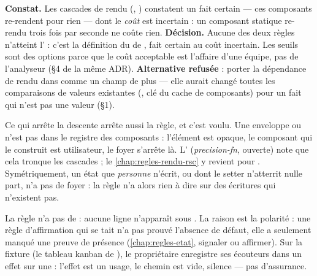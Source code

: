 \begin{decision}
\textbf{Constat.} Les cascades de rendu (, ) constatent un fait certain --- ces composants re-rendent pour rien --- dont le \emph{coût} est incertain : un composant statique re-rendu trois fois par seconde ne coûte rien.
\textbf{Décision.} Aucune des deux règles n'atteint l'\Error{} : c'est la définition du \Warning{} de , \og fait certain au coût incertain\fg. Les seuils sont des options parce que le coût acceptable est l'affaire d'une équipe, pas de l'analyseur (§4 de la même ADR). \textbf{Alternative refusée} : porter la dépendance de rendu dans  comme un champ de plus --- elle aurait changé toutes les comparaisons de valeurs existantes (, clé du cache de composants) pour un fait qui n'est pas une valeur (§1).
\end{decision}

Ce qui arrête la descente arrête aussi la règle, et c'est voulu. Une enveloppe  ou  n'est pas dans le registre des composants : l'élément est opaque, le composant qui le construit est utilisateur, le foyer s'arrête là. L' (\emph{precision-fn}, ouverte) note que cela tronque les cascades ; le \cref{chap:regles-rendu-rsc} y revient pour . Symétriquement, un état que \emph{personne} n'écrit, ou dont le setter n'atterrit nulle part, n'a pas de foyer : la règle n'a alors rien à dire sur des écritures qui n'existent pas.

\begin{piege}
La règle n'a pas de  : aucune ligne  n'apparaît sous . La raison est la polarité : une règle d'affirmation qui se tait n'a pas prouvé l'absence de défaut, elle a seulement manqué une preuve de présence (\cref{chap:regles-etat}, \og signaler ou affirmer\fg). Sur la fixture  (le tableau kanban de ), le propriétaire enregistre ses écouteurs dans un effet sur une  : l'effet est un usage, le chemin est vide, silence --- pas d'assurance.
\end{piege}

